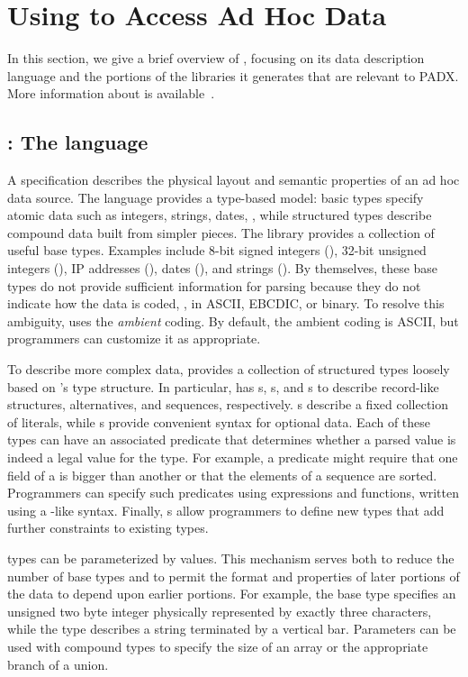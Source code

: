 \section{Using \pads{} to Access Ad Hoc Data}
\label{section:pads}
In this section, we give a brief overview of \pads{}, focusing on its
data description language and the portions of the libraries it generates
that are relevant to PADX. More information about \pads{} is
available~\cite{pldi05,padsmanual}.   


\subsection{\pads{}: The language}
\label{subsection:pads-language}
A \pads{} specification describes the physical layout and 
semantic properties of an ad hoc data source. 
The language provides a type-based model:
basic types specify atomic data such as integers, strings, dates, \etc{}, while
structured types describe compound data built from simpler pieces.
The \pads{} library provides a collection of useful base types.
Examples include
8-bit signed integers (),
32-bit unsigned integers (),
IP addresses (), 
dates (), and strings ().
By themselves, these base types do not provide sufficient information for parsing
because they do not indicate how the data is coded, \ie{}, in ASCII, EBCDIC, or binary.  
To resolve this ambiguity, \pads{} uses the \textit{ambient} coding.
By default, the ambient coding is ASCII, but programmers can customize
it as appropriate.

To describe more complex data, \pads{} provides a collection of 
structured types loosely based on \C{}'s type structure.
In particular, \pads{} has 
s, s, and s to describe
record-like structures, alternatives, and sequences, respectively.
s describe a fixed collection of literals, while s 
provide convenient syntax for optional data.
Each of these types can have an associated predicate that determines
whether a parsed value is indeed a legal
value for the type.  For example, a predicate might require that one
field of a  is bigger than another or that the elements
of a sequence are sorted.  Programmers can specify such
predicates using \pads{} expressions and functions, 
written using a \C{}-like syntax.
Finally, \pads{} s allow programmers
to define new types that add further constraints to existing types.

\pads{} types can be parameterized by values.
This mechanism serves both to reduce the number of base types and to permit the
format and properties of later portions of the data to depend upon earlier portions.
For example, 
the base type  specifies an unsigned two byte integer
physically represented by exactly three characters, while the type
describes a string terminated by a vertical bar.  Parameters can be 
used with compound types to specify the size of an array or the
appropriate branch of a union.

